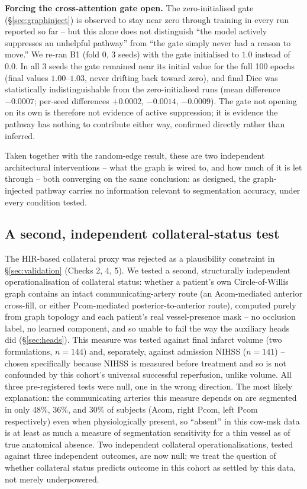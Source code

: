 \textbf{Forcing the cross-attention gate open.} The zero-initialised gate (\S\ref{sec:graphinject}) is observed to stay near zero through training in every run reported so far -- but this alone does not distinguish ``the model actively suppresses an unhelpful pathway'' from ``the gate simply never had a reason to move.'' We re-ran B1 (fold 0, 3 seeds) with the gate initialised to $1.0$ instead of $0.0$. In all 3 seeds the gate remained near its initial value for the full 100 epochs (final values $1.00$--$1.03$, never drifting back toward zero), and final Dice was statistically indistinguishable from the zero-initialised runs (mean difference $-0.0007$; per-seed differences $+0.0002$, $-0.0014$, $-0.0009$). The gate not opening on its own is therefore not evidence of active suppression; it is evidence the pathway has nothing to contribute either way, confirmed directly rather than inferred.

Taken together with the random-edge result, these are two independent architectural interventions -- what the graph is wired to, and how much of it is let through -- both converging on the same conclusion: as designed, the graph-injected pathway carries no information relevant to segmentation accuracy, under every condition tested.


\subsection{A second, independent collateral-status test}
\label{sec:secondcollateral}

The HIR-based collateral proxy was rejected as a plausibility constraint in \S\ref{sec:validation} (Checks 2, 4, 5). We tested a second, structurally independent operationalisation of collateral status: whether a patient's own Circle-of-Willis graph contains an intact communicating-artery route (an Acom-mediated anterior cross-fill, or either Pcom-mediated posterior-to-anterior route), computed purely from graph topology and each patient's real vessel-presence mask -- no occlusion label, no learned component, and so unable to fail the way the auxiliary heads did (\S\ref{sec:heads}). This measure was tested against final infarct volume (two formulations, $n=144$) and, separately, against admission NIHSS ($n=141$) -- chosen specifically because NIHSS is measured before treatment and so is not confounded by this cohort's universal successful reperfusion, unlike volume. All three pre-registered tests were null, one in the wrong direction. The most likely explanation: the communicating arteries this measure depends on are segmented in only 48\%, 36\%, and 30\% of subjects (Acom, right Pcom, left Pcom respectively) even when physiologically present, so ``absent'' in this cow-msk data is at least as much a measure of segmentation sensitivity for a thin vessel as of true anatomical absence. Two independent collateral operationalisations, tested against three independent outcomes, are now null; we treat the question of whether collateral status predicts outcome in this cohort as settled by this data, not merely underpowered.


